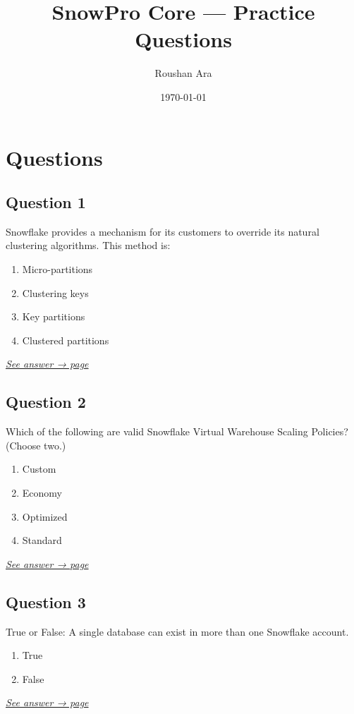 \documentclass[12pt]{article}
\title{SnowPro Core — Practice Questions}
\author{Roushan Ara}
\date{\today}
\newcommand{\seeanswer}[1]{%
  \par\smallskip\emph{\hyperref[ans:#1]{See answer → page \pageref{ans:#1}}}%
}
\begin{document}
\maketitle

\section*{Questions}

\subsection*{Question 1}\label{q:1}
Snowflake provides a mechanism for its customers to override its natural clustering algorithms. This method is:

\begin{enumerate}[label=\Alph*.]
  \item Micro-partitions
  \item Clustering keys
  \item Key partitions
  \item Clustered partitions
\end{enumerate}
\seeanswer{1}

\subsection*{Question 2}\label{q:2}
Which of the following are valid Snowflake Virtual Warehouse Scaling Policies? (Choose two.)

\begin{enumerate}[label=\Alph*.]
  \item Custom
  \item Economy
  \item Optimized
  \item Standard
\end{enumerate}
\seeanswer{2}

\subsection*{Question 3}\label{q:3}
True or False: A single database can exist in more than one Snowflake account.

\begin{enumerate}[label=\Alph*.]
  \item True
  \item False
\end{enumerate}
\seeanswer{3}
\end{document}

